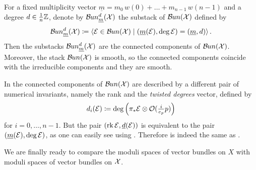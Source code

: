 \documentclass{article}
\begin{document}
\begin{thm}\cite[Corollary 2.0.9, Theorem 2.0.10]{Taams} \label{connected components of the moduli stack}
For a fixed multiplicity vector $\underline{m} = m_0 \, w(0) + \dots + m_{n-1} \, w(n-1)$ and a degree $d \in \tfrac{1}{n} \mathbb{Z}$, denote by $\mathcal{B}\kern -.5pt un_{\underline{m}}^{d}(\mathcal{X})$ the substack of $\mathcal{B}\kern -.5pt un(\mathcal{X})$ defined by
\begin{equation}
\mathcal{B}\kern -.5pt un_{\underline{m}}^{d}(\mathcal{X}) \coloneqq \left< \mathcal{E} \in \mathcal{B}\kern -.5pt un(\mathcal{X}) \;\middle|\; ( \underline{m}(\mathcal{E}), \deg \mathcal{E}) = (\underline{m}, d)\right>.
\end{equation}
Then the substacks $\mathcal{B}\kern -.5pt un_{\underline{m}}^{d}(\mathcal{X})$ are the connected components of $\mathcal{B}\kern -.5pt un(\mathcal{X})$. Moreover, the stack $\mathcal{B}\kern -.5pt un(\mathcal{X})$ is smooth, so the connected components coincide with the irreducible components and they are smooth.
\end{thm}

\begin{rmk}
In \cite[\S 2]{Taams} the connected components of $\mathcal{B}\kern -.5pt un(\mathcal{X})$ are described by a different pair of numerical invariants, namely the rank and the \textit{twisted degrees} vector, defined by
\begin{equation}
d_{i}(\mathcal{E}) \coloneqq \deg \left( \pi_* \mathcal{E} \otimes \mathcal{O}(\tfrac{i}{e_p}p) \right)
\end{equation}
for $i = 0, \dots , n-1$. But the pair $(\operatorname{rk} \mathcal{E}, \underline{d}(\mathcal{E}))$ is equivalent to the pair $(\underline{m}(\mathcal{E}), \deg \mathcal{E})$, as one can easily see using \cite[Corollary 1.2.21]{Taams}. Therefore  is indeed the same as \cite[Corollary 2.0.9, Theorem 2.0.10]{Taams}.
\end{rmk}

We are finally ready to compare the moduli spaces of vector bundles on $X$ with moduli spaces of vector bundles on $\mathcal{X}$.
\end{document}
